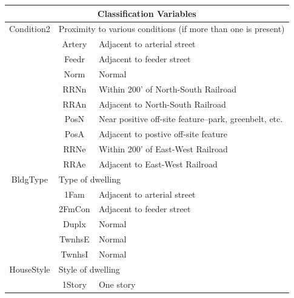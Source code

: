 \documentclass[11pt]{scrartcl} %
\begin{document}
\begin{center}
\begin{tabular}{c c c c c c}
\hline
\multicolumn{6}{|c|}{Classification Variables}\\
\hline
\multicolumn{2}{|c}{Condition2} & \multicolumn{4}{l|}{Proximity to various conditions (if more than one is present)}\\ 
\multicolumn{2}{|c}{} & \multicolumn{1}{c}{Artery} & \multicolumn{3}{l|}{Adjacent to arterial street}\\
\multicolumn{2}{|c}{} & \multicolumn{1}{c}{Feedr} & \multicolumn{3}{l|}{Adjacent to feeder street}\\
\multicolumn{2}{|c}{} & \multicolumn{1}{c}{Norm} & \multicolumn{3}{l|}{Normal}\\
\multicolumn{2}{|c}{} & \multicolumn{1}{c}{RRNn} & \multicolumn{3}{l|}{Within 200' of North-South Railroad}\\
\multicolumn{2}{|c}{} & \multicolumn{1}{c}{RRAn} & \multicolumn{3}{l|}{Adjacent to North-South Railroad}\\
\multicolumn{2}{|c}{} & \multicolumn{1}{c}{PosN} & \multicolumn{3}{l|}{Near positive off-site feature--park, greenbelt, etc.}\\
\multicolumn{2}{|c}{} & \multicolumn{1}{c}{PosA} & \multicolumn{3}{l|}{Adjacent to postive off-site feature}\\
\multicolumn{2}{|c}{} & \multicolumn{1}{c}{RRNe} & \multicolumn{3}{l|}{Within 200' of East-West Railroad}\\
\multicolumn{2}{|c}{} & \multicolumn{1}{c}{RRAe} & \multicolumn{3}{l|}{Adjacent to East-West Railroad}\\
\hline
\multicolumn{2}{|c}{BldgType} & \multicolumn{4}{l|}{Type of dwelling}\\ 
\multicolumn{2}{|c}{} & \multicolumn{1}{c}{1Fam} & \multicolumn{3}{l|}{Adjacent to arterial street}\\
\multicolumn{2}{|c}{} & \multicolumn{1}{c}{2FmCon} & \multicolumn{3}{l|}{Adjacent to feeder street}\\
\multicolumn{2}{|c}{} & \multicolumn{1}{c}{Duplx} & \multicolumn{3}{l|}{Normal}\\
\multicolumn{2}{|c}{} & \multicolumn{1}{c}{TwnhsE} & \multicolumn{3}{l|}{Normal}\\
\multicolumn{2}{|c}{} & \multicolumn{1}{c}{TwnhsI} & \multicolumn{3}{l|}{Normal}\\
\hline
\multicolumn{2}{|c}{HouseStyle} & \multicolumn{4}{l|}{Style of dwelling}\\ 
\multicolumn{2}{|c}{} & \multicolumn{1}{c}{1Story} & \multicolumn{3}{l|}{One story}\\

\end{tabular}
\end{center}
\end{document}
